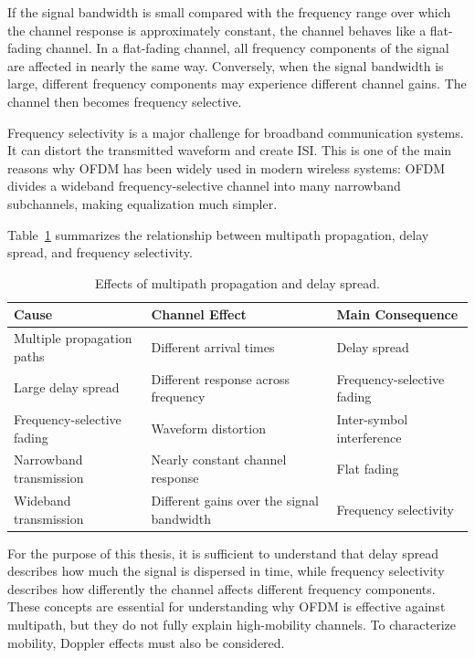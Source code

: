 If the signal bandwidth is small compared with the frequency range over which the channel response is approximately constant, the channel behaves like a flat-fading channel. In a flat-fading channel, all frequency components of the signal are affected in nearly the same way. Conversely, when the signal bandwidth is large, different frequency components may experience different channel gains. The channel then becomes frequency selective.

Frequency selectivity is a major challenge for broadband communication systems. It can distort the transmitted waveform and create ISI. This is one of the main reasons why OFDM has been widely used in modern wireless systems: OFDM divides a wideband frequency-selective channel into many narrowband subchannels, making equalization much simpler.

Table~\ref{tab:delay_spread_effects} summarizes the relationship between multipath propagation, delay spread, and frequency selectivity.

\begin{table}[H]
\centering
\caption{Effects of multipath propagation and delay spread.}
\label{tab:delay_spread_effects}

\begin{tabular}{|p{4cm}|p{4cm}|p{5cm}|}
\hline
\textbf{Cause} &
\textbf{Channel Effect} &
\textbf{Main Consequence} \\
\hline

Multiple propagation paths &
Different arrival times &
Delay spread \\
\hline

Large delay spread &
Different response across frequency &
Frequency-selective fading \\
\hline

Frequency-selective fading &
Waveform distortion &
Inter-symbol interference \\
\hline

Narrowband transmission &
Nearly constant channel response &
Flat fading \\
\hline

Wideband transmission &
Different gains over the signal bandwidth &
Frequency selectivity \\
\hline

\end{tabular}

\end{table}

For the purpose of this thesis, it is sufficient to understand that delay spread describes how much the signal is dispersed in time, while frequency selectivity describes how differently the channel affects different frequency components. These concepts are essential for understanding why OFDM is effective against multipath, but they do not fully explain high-mobility channels. To characterize mobility, Doppler effects must also be considered.

